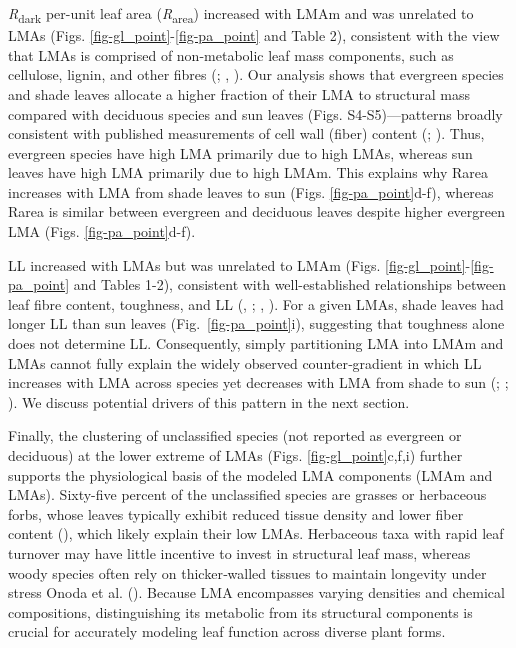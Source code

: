 \documentclass[
  12pt,
  letterpaper,
  DIV=11,
  numbers=noendperiod]{scrartcl}
\begin{document}
\emph{R}\textsubscript{dark} per-unit leaf area
(\emph{R}\textsubscript{area}) increased with LMAm and was unrelated to
LMAs (Figs. \ref{fig-gl_point}-\ref{fig-pa_point} and Table 2),
consistent with the view that LMAs is comprised of non-metabolic leaf
mass components, such as cellulose, lignin, and other fibres
(;
,
). Our analysis shows that evergreen
species and shade leaves allocate a higher fraction of their LMA to
structural mass compared with deciduous species and sun leaves (Figs.
S4-S5)---patterns broadly consistent with published measurements of cell
wall (fiber) content (;
). Thus, evergreen
species have high LMA primarily due to high LMAs, whereas sun leaves
have high LMA primarily due to high LMAm. This explains why Rarea
increases with LMA from shade leaves to sun (Figs.
\ref{fig-pa_point}d-f), whereas Rarea is similar between evergreen and
deciduous leaves despite higher evergreen LMA (Figs.
\ref{fig-pa_point}d-f).

LL increased with LMAs but was unrelated to LMAm (Figs.
\ref{fig-gl_point}-\ref{fig-pa_point} and Tables 1-2), consistent with
well-established relationships between leaf fibre content, toughness,
and LL (,
; , ). For a given LMAs, shade
leaves had longer LL than sun leaves (Fig.~\ref{fig-pa_point}i),
suggesting that toughness alone does not determine LL. Consequently,
simply partitioning LMA into LMAm and LMAs cannot fully explain the
widely observed counter‐gradient in which LL increases with LMA across
species yet decreases with LMA from shade to sun
(;
;
). We discuss potential
drivers of this pattern in the next section.

Finally, the clustering of unclassified species (not reported as
evergreen or deciduous) at the lower extreme of LMAs (Figs.
\ref{fig-gl_point}c,f,i) further supports the physiological basis of the
modeled LMA components (LMAm and LMAs). Sixty-five percent of the
unclassified species are grasses or herbaceous forbs, whose leaves
typically exhibit reduced tissue density and lower fiber content
(), which likely explain
their low LMAs. Herbaceous taxa with rapid leaf turnover may have little
incentive to invest in structural leaf mass, whereas woody species often
rely on thicker‐walled tissues to maintain longevity under stress Onoda
et al. (). Because LMA encompasses varying
densities and chemical compositions, distinguishing its metabolic from
its structural components is crucial for accurately modeling leaf
function across diverse plant forms.
\end{document}
